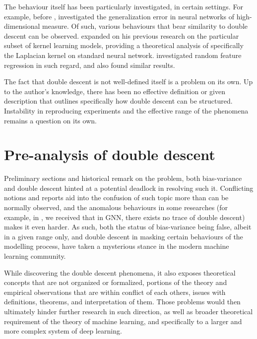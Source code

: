 \documentclass[twoside,10pt]{article}
\begin{document}
The behaviour itself has been particularly investigated, in certain settings. For example, before \cite{belkin_reconciling_2019}, \cite{advani2017highdimensionaldynamicsgeneralizationerror} investigated the generalization error in neural networks of high-dimensional measure. Of such, various behaviours that bear similarity to double descent can be observed. \cite{belkin2018understanddeeplearningneed} expanded on his previous research on the particular subset of kernel learning models, providing a theoretical analysis of specifically the Laplacian kernel on standard neural network. \cite{mei2020generalizationerrorrandomfeatures} investigated random feature regression in such regard, and also found similar results. 

The fact that double descent is not well-defined itself is a problem on its own. Up to the author's knowledge, there has been no effective definition or given description that outlines specifically how double descent can be structured. Instability in reproducing experiments and the effective range of the phenomena remains a question on its own. 
\clearpage
\section{Pre-analysis of double descent}
Preliminary sections and historical remark on the problem, both bias-variance and double descent hinted at a potential deadlock in resolving such it. Conflicting notions and reports aid into the confusion of such topic more than can be normally observed, and the anomalous behaviours in some researches (for example, in \cite{shi2024homophilymodulatesdoubledescent}, we received that in GNN, there exists no trace of double descent) makes it even harder. As such, both the status of bias-variance being false, albeit in a given range only, and double descent in masking certain behaviours of the modelling process, have taken a mysterious stance in the modern machine learning community. 

While discovering the double descent phenomena, it also exposes theoretical concepts that are not organized or formalized, portions of the theory and empirical observations that are within conflict of each others, issues with definitions, theorems, and interpretation of them. Those problems would then ultimately hinder further research in such direction, as well as broader theoretical requirement of the theory of machine learning, and specifically to a larger and more complex system of deep learning. 
\end{document}
